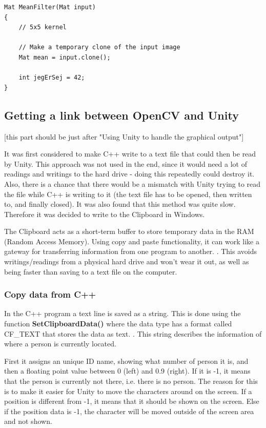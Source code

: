 \begin{lstlisting}
Mat MeanFilter(Mat input)
{
	// 5x5 kernel

	// Make a temporary clone of the input image
	Mat mean = input.clone();

	int jegErSej = 42;
}
\end{lstlisting}

\subsection{Getting a link between OpenCV and Unity}
[this part should be just after "Using Unity to handle the graphical output"]

It was first considered to make C++ write to a text file that could then be read by Unity. This approach was not used in the end, since it would need a lot of readings and writings to the hard drive - doing this repeatedly could destroy it. Also, there is a chance that there would be a mismatch with Unity trying to read the file while C++ is writing to it (the text file has to be opened, then written to, and finally closed). It was also found that this method was quite slow. Therefore it was decided to write to the Clipboard in Windows.

The Clipboard acts as a short-term buffer to store temporary data in the RAM (Random Access Memory). Using copy and paste functionality, it can work like a gateway for transferring information from one program to another. \citep{clipboard1}. This avoids writings/readings from a physical hard drive and won't wear it out, as well as being faster than saving to a text file on the computer.

\subsubsection{Copy data from C++}
In the C++ program a text line is saved as a string. This is done using the function \textbf{SetClipboardData()} where the data type has a format called CF\_TEXT that stores the data as text.\citep{clipboard2} \citep{clipboard3}. This string describes the information of where a person is currently located.

First it assigns an unique ID name, showing what number of person it is, and then a floating point value between 0 (left) and 0.9 (right). If it is -1, it means that the person is currently not there, i.e. there is no person. The reason for this is to make it easier for Unity to move the characters around on the screen. If a position is different from -1, it means that it should be shown on the screen. Else if the position data is -1, the character will be moved outside of the screen area and not shown.

